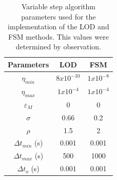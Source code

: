 \documentclass[twoside,11pt]{report}
\begin{document}
\begin{table}[H]
\centering
\caption{Variable step algorithm parameters used for the implementation of  the LOD and FSM methods. This values were determined by observation.}
\label{tab:parameters_vari_time _Step}
\begin{tabular}{|c|c|c|}
\hline
Parameters             & LOD          & FSM         \\ \hline
$\eta_{min}$           & $8x10^{-10}$ & $1x10^{-8}$ \\ \hline
$\eta_{max}$           & $1x10^{-4}$  & $1x10^{-4}$ \\ \hline
$\varepsilon_M$        & 0            & 0           \\ \hline
$\sigma$               & 0.66         & 0.2         \\ \hline
$\rho$                 & 1.5          & 2           \\ \hline
$\Delta   t_{min}$ (s) & 0.001        & 0.001       \\ \hline
$\Delta   t_{max}$ (s) & 500          & 1000        \\ \hline
$\Delta t_o$   (s)     & 0.001        & 0.001       \\ \hline
\end{tabular}%
\end{table}

\printbibliography
\end{document}
